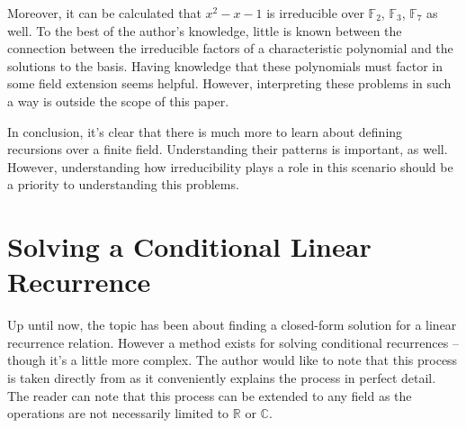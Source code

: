 \documentclass[a4paper]{article}
\theoremstyle{definition}
\begin{document}
Moreover, it can be calculated that $x^2-x-1$ is irreducible over $\mathbb{F}_2$, $\mathbb{F}_3$, $\mathbb{F}_7$ as well. To the best of the author's knowledge, little is known between the connection between the irreducible factors of a characteristic polynomial and the solutions to the basis. Having knowledge that these polynomials must factor in some field extension seems helpful. However, interpreting these problems in such a way is outside the scope of this paper.

In conclusion, it's clear that there is much more to learn about defining recursions over a finite field. Understanding their patterns is important, as well. However, understanding how irreducibility plays a role in this scenario should be a priority to understanding this problems.

\section{Solving a Conditional Linear Recurrence}

Up until now, the topic has been about finding a closed-form solution for a linear recurrence relation. However a method exists for solving conditional recurrences -- though it's a little more complex. The author would like to note that this process is taken directly from \cite{bib:gen_cond_rec} as it conveniently explains the process in perfect detail. The reader can note that this process can be extended to any field as the operations are not necessarily limited to $\mathbb{R}$ or $\mathbb{C}$.
\end{document}
